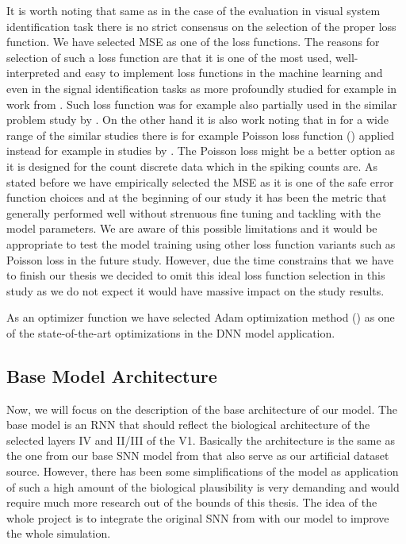 It is worth noting that same as in the case of the evaluation in visual system identification task there is no strict consensus on the selection of the proper loss function. We have selected MSE as one of the loss functions. The reasons for selection of such a loss function are that it is one of the most used, well-interpreted and easy to implement loss functions in the machine learning and even in the signal identification tasks as more profoundly studied for example in work from \citet{wang2009mse, soderstrom2018errors}. Such loss function was for example also partially used in the similar problem study by \citet{antolik2016local}. On the other hand it is also work noting that in for a wide range of the similar studies there is for example Poisson loss function (\citet{terven2024lossfunctionsmetricsdeep}) applied instead for example in studies by \citet{Wang2023towards, sinz2018stimulus}. The Poisson loss might be a better option as it is designed for the count discrete data which in the spiking counts are. As stated before we have empirically selected the MSE as it is one of the safe error function choices and at the beginning of our study it has been the metric that generally performed well without strenuous fine tuning and tackling with the model parameters. We are aware of this possible limitations and it would be appropriate to test the model training using other loss function variants such as Poisson loss in the future study. However, due the time constrains that we have to finish our thesis we decided to omit this ideal loss function selection in this study as we do not expect it would have massive impact on the study results.

As an optimizer function we have selected Adam optimization method (\citet{kingma2017adammethodstochasticoptimization}) as one of the state-of-the-art optimizations in the DNN model application. 

\subsection{Base Model Architecture}
\label{subsec:base_model_architecture}
Now, we will focus on the description of the base architecture of our model. The base model is an RNN that should reflect the biological architecture of the selected layers IV and II/III of the V1. Basically the architecture is the same as the one from our base SNN model from \citet{antolik2024comprehensive} that also serve as our artificial dataset source. However, there has been some simplifications of the model as application of such a high amount of the biological plausibility is very demanding and would require much more research out of the bounds of this thesis. The idea of the whole project is to integrate the original SNN from \citet{antolik2024comprehensive} with our model to improve the whole simulation.

